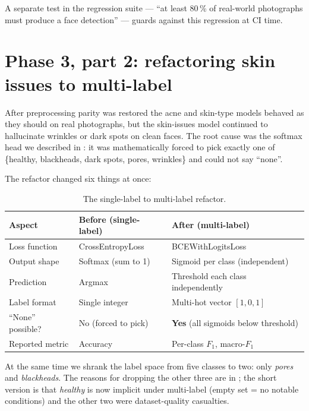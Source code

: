 \documentclass[11pt,a4paper,oneside]{report}
\begin{document}
A separate test in the regression suite --- ``at least 80\,\% of
real-world photographs must produce a face detection'' --- guards
against this regression at CI time.

\section{Phase 3, part 2: refactoring skin issues to multi-label}\label{sec:multi-label-refactor}

After preprocessing parity was restored the acne and skin-type
models behaved as they should on real photographs, but the
skin-issues model continued to hallucinate wrinkles or dark spots
on clean faces. The root cause was the softmax head we described in
: it was mathematically forced to pick
exactly one of \{healthy, blackheads, dark spots, pores, wrinkles\}
and could not say ``none''.

The refactor changed six things at once:

\begin{table}[htbp]
    \centering
    \caption{The single-label to multi-label refactor.}
    \label{tab:multi-label-refactor}
    \small
    \begin{tabularx}{\linewidth}{lXX}
        \toprule
        \textbf{Aspect} & \textbf{Before (single-label)} & \textbf{After (multi-label)} \\
        \midrule
        Loss function      & CrossEntropyLoss              & BCEWithLogitsLoss \\
        Output shape       & Softmax (sum to 1)            & Sigmoid per class (independent) \\
        Prediction         & Argmax                        & Threshold each class independently \\
        Label format       & Single integer                & Multi-hot vector \([1,0,1]\) \\
        ``None'' possible? & No (forced to pick)           & \textbf{Yes} (all sigmoids below threshold) \\
        Reported metric    & Accuracy                      & Per-class \(F_1\), macro-\(F_1\) \\
        \bottomrule
    \end{tabularx}
\end{table}

At the same time we shrank the label space from five classes to
two: only \emph{pores} and \emph{blackheads}. The reasons for
dropping the other three are in ; the
short version is that \emph{healthy} is now implicit under
multi-label (empty set = no notable conditions) and the other two
were dataset-quality casualties.
\end{document}
